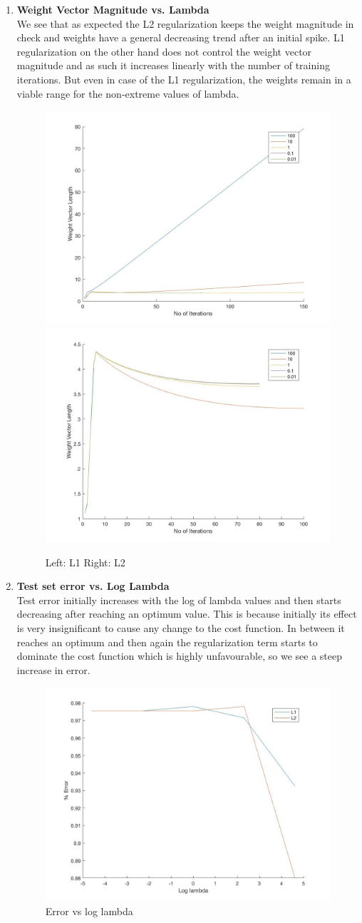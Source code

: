 \documentclass[11pt,twoside]{article}
\begin{document}
\begin{enumerate}[label=(\alph*)]
\item \textbf{Weight Vector Magnitude vs. Lambda}\\
We see that as expected the L2 regularization keeps the weight magnitude in check and weights have a general decreasing trend after an initial spike. L1 regularization on the other hand does not control the weight vector magnitude and as such it increases linearly with the number of training iterations. But even in case of the L1 regularization, the weights remain in a viable range for the non-extreme values of lambda.
\begin{figure}[H]
  \includegraphics[width=0.45\columnwidth]{5c_l1}
  \includegraphics[width=0.45\columnwidth]{5c_l2}
  \centering
  \caption{Left: L1 Right: L2}
  \label{fig:5_c}
  \end{figure}

\item \textbf{Test set error vs. Log Lambda}\\
Test error initially increases with the log of lambda values and then starts decreasing after reaching an optimum value. This is because initially its effect is very insignificant to cause any change to the cost function. In between it reaches an optimum  and then again the regularization term starts to dominate the cost function which is highly unfavourable, so we see a steep increase in error.
\begin{figure}[H]
  \includegraphics[width=0.6\columnwidth]{5d}
  \centering
  \caption{Error vs log lambda}
  \label{fig:5_d}
  \end{figure}


\end{enumerate}
\end{document}
